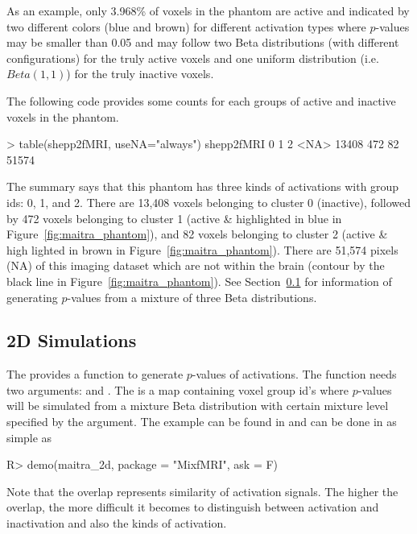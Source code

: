 As an example, only 3.968\% of voxels in the  phantom are active
and indicated by two different colors (blue and brown)
for different activation types where $p$-values may be smaller than 0.05
and may follow two Beta distributions (with different configurations)
for the truly active voxels and one uniform distribution (i.e. $Beta(1, 1)$)
for the truly inactive voxels.

The following code provides some counts for each groups of active and
inactive voxels in the  phantom.
\begin{CodeOutput}[title=Summary of shepp2fMRI Phantoms]
> table(shepp2fMRI, useNA="always")
shepp2fMRI
    0     1     2  <NA> 
13408   472    82 51574 
\end{CodeOutput}
The summary says that this phantom has three kinds of activations
with group ids: 0, 1, and 2.
There are 13,408 voxels belonging to cluster 0 (inactive),
followed by 472 voxels belonging to cluster 1 (active \& highlighted in
blue in Figure~\ref{fig:maitra_phantom}), and
82 voxels belonging to cluster 2 (active \& high lighted in
 brown in Figure~\ref{fig:maitra_phantom}).
There are 51,574 pixels (NA) of this
imaging dataset which are not within the brain (contour by the black line
in Figure~\ref{fig:maitra_phantom}).
See Section~\ref{sec:2d_simulations} for information of generating
$p$-values from a mixture of three Beta distributions.


\subsection[2D Simulations]{2D Simulations}
\label{sec:2d_simulations}

The  provides a function 
to generate $p$-values of activations.
The function needs two arguments:  and .
The  is a map containing voxel group id's
where $p$-values will be simulated from a mixture Beta distribution with
certain mixture level specified by the  argument.
The example can be found in
 and can be done in 
as simple as
\begin{Code}[title=Simulations of Active Voxels]
R> demo(maitra_2d, package = "MixfMRI", ask = F)
\end{Code}
Note that the overlap represents similarity of activation signals. The higher
the overlap, the more difficult it becomes to distinguish between
activation and inactivation and also the kinds of activation. 

